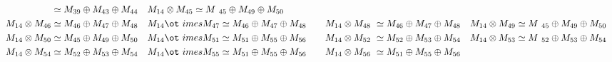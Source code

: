 \begin{align*}
{} \simeq M_{39} \oplus M_{43} \oplus M_{44} &&& M_{14} \otimes M_{45} \simeq M\
_{45} \oplus M_{49} \oplus M_{50}\\
M_{14} \otimes M_{46} \simeq M_{46} \oplus M_{47} \oplus M_{48} &&& M_{14} \ot\
imes M_{47} \simeq M_{46} \oplus M_{47} \oplus M_{48} &&& M_{14} \otimes M_{48\
} \simeq M_{46} \oplus M_{47} \oplus M_{48} &&& M_{14} \otimes M_{49} \simeq M\
_{45} \oplus M_{49} \oplus M_{50}\\
M_{14} \otimes M_{50} \simeq M_{45} \oplus M_{49} \oplus M_{50} &&& M_{14} \ot\
imes M_{51} \simeq M_{51} \oplus M_{55} \oplus M_{56} &&& M_{14} \otimes M_{52\
} \simeq M_{52} \oplus M_{53} \oplus M_{54} &&& M_{14} \otimes M_{53} \simeq M\
_{52} \oplus M_{53} \oplus M_{54}\\
M_{14} \otimes M_{54} \simeq M_{52} \oplus M_{53} \oplus M_{54} &&& M_{14} \ot\
imes M_{55} \simeq M_{51} \oplus M_{55} \oplus M_{56} &&& M_{14} \otimes M_{56\
} \simeq M_{51} \oplus M_{55} \oplus M_{56}\\
\end{align*}

